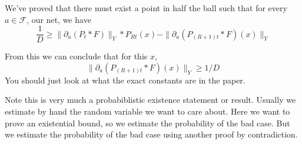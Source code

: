 
We've proved that there must exist a point in half the ball such that for every $a \in \mathcal{F}$, our net, we have
\[
\frac{1}{D} \geq \|\partial_a(P_t *F)\|_{Y} * P_{Rt}(x) - \|\partial_a(P_{(R + 1)t}*F)(x)\|_Y
\]

From this we can conclude that for this $x$,
\[
\|\partial_a(P_{(R + 1)t} * F)(x)\|_Y \ge 1/D
\]
You should just look at what the exact constants are in the paper. 


%

Note this is very much a probabiblistic existence statement or result. %
Usually we estimate by hand the random variable we want to care about. Here we want to prove an existential bound, so we estimate the probability of the bad case. But we estimate the probability of the bad case using another proof by contradiction.

